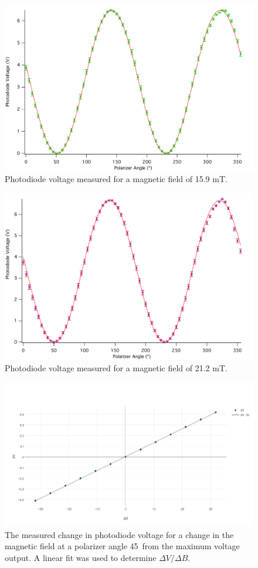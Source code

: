 \documentclass[prb,preprint]{revtex4-1}
\begin{document}
{\begin{figure}
\includegraphics[width = 5.8in]{15A.pdf}
\caption{\label{onehalf}Photodiode voltage measured for a magnetic field of 15.9 mT.}
\end{figure}

\begin{figure}
\includegraphics[width = 5.8in]{2A.pdf}
\caption{\label{maxfield}Photodiode voltage measured for a magnetic field of 21.2 mT.}
\end{figure}

\begin{figure}
\includegraphics[width =6.3in]{verdetpic2.pdf}
\caption{\label{method1pic} The measured change in photodiode voltage for a change in the magnetic field at a polarizer angle 45\degree\  from the maximum voltage output. A linear fit was used to determine $\Delta V/\Delta B$.}
\end{figure}
}
\end{document}

